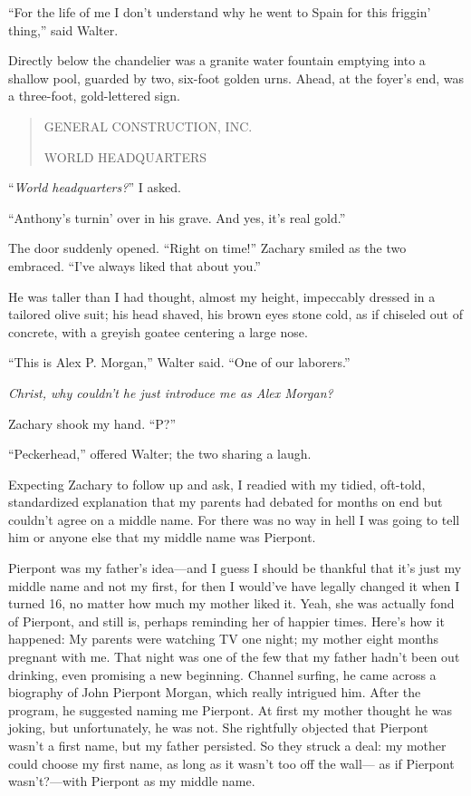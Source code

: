 ``For the life of me I don't understand why he went to Spain for this
friggin' thing,'' said Walter.

Directly below the chandelier was a granite water fountain emptying into
a shallow pool, guarded by two, six-foot golden urns. Ahead, at the
foyer's end, was a three-foot, gold-lettered sign.

\begin{quote}
GENERAL CONSTRUCTION, INC.

WORLD HEADQUARTERS
\end{quote}

``\emph{World headquarters?}'' I asked.

``Anthony's turnin' over in his grave. And yes, it's real gold.''

The door suddenly opened. ``Right on time!'' Zachary smiled as the two
embraced. ``I've always liked that about you.''

He was taller than I had thought, almost my height, impeccably dressed
in a tailored olive suit; his head shaved, his brown eyes stone cold, as
if chiseled out of concrete, with a greyish goatee centering a large
nose.

``This is Alex P. Morgan,'' Walter said. ``One of our laborers.''

\emph{Christ, why couldn't he just introduce me as Alex Morgan?}

Zachary shook my hand. ``P?''

``Peckerhead,'' offered Walter; the two sharing a laugh.

Expecting Zachary to follow up and ask, I readied with my tidied,
oft-told, standardized explanation that my parents had debated for
months on end but couldn't agree on a middle name. For there was no way
in hell I was going to tell him or anyone else that my middle name was
Pierpont.

Pierpont was my father's idea---and I guess I should be thankful that
it's just my middle name and not my first, for then I would've have
legally changed it when I turned 16, no matter how much my mother liked
it. Yeah, she was actually fond of Pierpont, and still is, perhaps
reminding her of happier times. Here's how it happened: My parents were
watching TV one night; my mother eight months pregnant with me. That
night was one of the few that my father hadn't been out drinking, even
promising a new beginning. Channel surfing, he came across a biography
of John Pierpont Morgan, which really intrigued him. After the program,
he suggested naming me Pierpont. At first my mother thought he was
joking, but unfortunately, he was not. She rightfully objected that
Pierpont wasn't a first name, but my father persisted. So they struck a
deal: my mother could choose my first name, as long as it wasn't too off
the wall--- as if Pierpont wasn't?---with Pierpont as my middle name.

